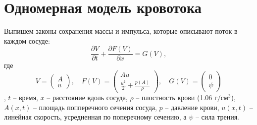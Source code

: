 
\section{Одномерная модель кровотока}
Выпишем законы сохранения массы и импульса, которые описывают поток в каждом сосуде:
\begin{equation}\label{eq:e1}
	\frac{\partial V}{\partial t} + \frac{\partial F(V)}{\partial x} = G(V),
\end{equation}
где
\[
V = \begin{pmatrix} 
	A \\ 
	u 
\end{pmatrix}, \quad 
F(V) = \begin{pmatrix} 
	Au \\ 
	\frac{u^2}{2} + \frac{p(A)}{\rho} 
\end{pmatrix}, \quad 
G(V) = \begin{pmatrix} 
	0 \\ 
	\psi 
\end{pmatrix}
\], $t$ -- время, $x$ -- расстояние вдоль сосуда, $\rho$ -- плостность крови (1.06 $г/см^{3}$), $A(x,t)$ -- площадь попперечного сечения сосуда, $p$ -- давление крови, $u(x,t)$ -- линейная скорость, усредненная по поперечному сечению, а  $\psi$ -- сила трения.


\endinput